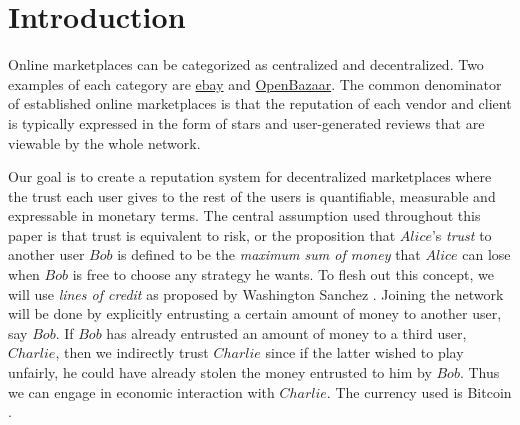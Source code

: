 \section{Introduction}
   Online marketplaces can be categorized as centralized and decentralized.
   Two examples of each category are \href{http://www.ebay.com}{ebay} and \href{https://openbazaar.org/}{OpenBazaar}.
   The common denominator of established online marketplaces is that the reputation of each vendor and client is typically
   expressed in the form of stars and user-generated reviews that are viewable by the whole network.

   Our goal is to create a reputation system for decentralized marketplaces where the trust each user gives to the rest of
   the users is quantifiable, measurable and expressable in monetary terms. The central assumption used throughout this paper
   is that trust is equivalent to risk, or the proposition that $Alice$'s \textit{trust} to another user $Bob$ is defined to
   be the \textit{maximum sum of money} that $Alice$ can lose when $Bob$ is free to choose any strategy he wants. To flesh
   out this concept, we will use \textit{lines of credit} as proposed by Washington Sanchez \cite{loc}. Joining the network
   will be done by explicitly entrusting a certain amount of money to another user, say $Bob$. If $Bob$ has already entrusted
   an amount of money to a third user, $Charlie$, then we indirectly trust $Charlie$ since if the latter wished to play
   unfairly, he could have already stolen the money entrusted to him by $Bob$. Thus we can engage in economic interaction
   with $Charlie$. The currency used is Bitcoin \cite{bitcoin}.

